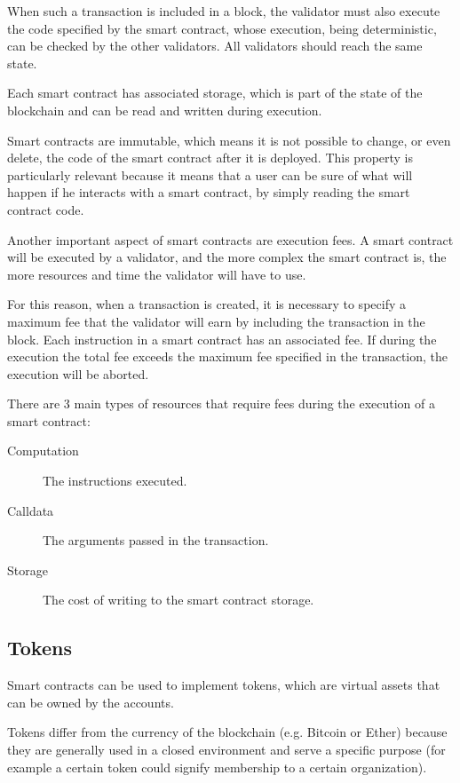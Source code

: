\documentclass[12pt]{article}
\begin{document}
When such a transaction is included in a block, the validator must also execute the code specified by the smart contract, whose execution, being deterministic, can be checked by the other validators. All validators should reach the same state.

Each smart contract has associated storage, which is part of the state of the blockchain and can be read and written during execution.

Smart contracts are immutable, which means it is not possible to change, or even delete, the code of the smart contract after it is deployed. 
This property is particularly relevant because it means that a user can be sure of what will happen if he interacts with a smart contract, by simply reading the smart contract code.

Another important aspect of smart contracts are execution fees. A smart contract will be executed by a validator, and the more complex the smart contract is, the more resources and time the validator will have to use.

For this reason, when a transaction is created, it is necessary to specify a maximum fee that the validator will earn by including the transaction in the block.
Each instruction in a smart contract has an associated fee. If during the execution the total fee exceeds the maximum fee specified in the transaction, the execution will be aborted.

There are 3 main types of resources that require fees during the execution of a smart contract:
\begin{description}
    \item[Computation] The instructions executed.
    \item[Calldata] The arguments passed in the transaction.
    \item[Storage] The cost of writing to the smart contract storage.  
\end{description}

\subsection{Tokens} \label{subsection:tokens}
Smart contracts can be used to implement tokens, which are virtual assets that can be owned by the accounts.

Tokens differ from the currency of the blockchain (e.g. Bitcoin or Ether) because they are generally used in a closed environment and serve a specific purpose (for example a certain token could signify membership to a certain organization).
\end{document}
